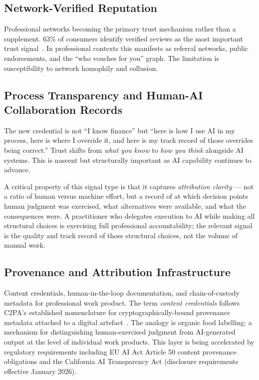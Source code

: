 \documentclass[11pt,a4paper]{article}
\begin{document}
\subsection{Network-Verified Reputation}
Professional networks becoming the primary trust mechanism rather than a supplement. 63\% of
consumers identify verified reviews as the most important trust signal~\cite{brightlocal2025}. In
professional contexts this manifests as referral networks, public endorsements, and the
``who vouches for you'' graph. The limitation is susceptibility to network homophily and
collusion.

\subsection{Process Transparency and Human-AI Collaboration Records}
The new credential is not ``I know finance'' but ``here is how I use AI in my process, here is
where I override it, and here is my track record of those overrides being correct.'' Trust shifts
from \emph{what you know} to \emph{how you think} alongside AI systems. This is nascent but
structurally important as AI capability continues to advance.

A critical property of this signal type is that it captures \emph{attribution clarity} — not a
ratio of human versus machine effort, but a record of at which decision points human judgment was
exercised, what alternatives were available, and what the consequences were. A practitioner who
delegates execution to AI while making all structural choices is exercising full professional
accountability; the relevant signal is the quality and track record of those structural choices,
not the volume of manual work.

\subsection{Provenance and Attribution Infrastructure}
Content credentials, human-in-the-loop documentation, and chain-of-custody metadata for
professional work product. The term \emph{content credentials} follows C2PA's established
nomenclature for cryptographically-bound provenance metadata attached to a digital
artefact~\cite{c2pa2024}. The analogy is organic food labelling: a mechanism for distinguishing
human-exercised judgment from AI-generated output at the level of individual work products.
This layer is being accelerated by regulatory requirements including EU AI Act Article 50
content provenance obligations and the California AI Transparency Act (disclosure requirements
effective January 2026).
\end{document}
